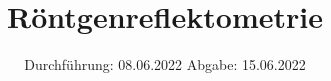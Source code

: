 

\subject{V44}
\title{Röntgenreflektometrie}
\date{%
  Durchführung: 08.06.2022
  \hspace{3em}
  Abgabe: 15.06.2022
}



\maketitle
\thispagestyle{empty}
\tableofcontents
\newpage






\printbibliography{}


